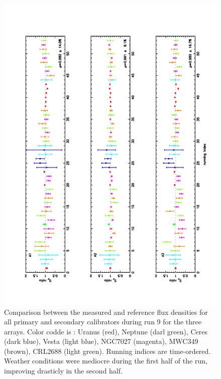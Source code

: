 \begin{figure}
\begin{center}
  \includegraphics[clip, angle=-90, scale=0.6]{Figures/ratio_all.pdf}
  \caption{Comparison between the measured and reference flux densities for all primary and secondary calibrators  during run 9
    for the three arrays. Color codde is : Uranus (red), Neptune (darl green), Ceres (dark blue), Vesta (light blue), NGC7027 (magenta), MWC349 (brown),
    CRL2688 (light green). Running indices  are time-ordered. Weather conditions were mediocre during the first half of the run, improving
  drasticly in the second half.}
\label{fig:all}
\end{center}
\end{figure}

